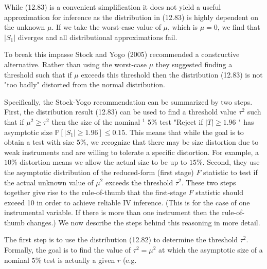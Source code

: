 \documentclass[10pt]{article}
\begin{document}
While (12.83) is a convenient simplification it does not yield a useful approximation for inference as the distribution in (12.83) is highly dependent on the unknown $\mu$. If we take the worst-case value of $\mu$, which is $\mu=0$, we find that $\left|S_{1}\right|$ diverges and all distributional approximations fail.

To break this impasse Stock and Yogo (2005) recommended a constructive alternative. Rather than using the worst-case $\mu$ they suggested finding a threshold such that if $\mu$ exceeds this threshold then the distribution (12.83) is not "too badly" distorted from the normal distribution.

Specifically, the Stock-Yogo recommendation can be summarized by two steps. First, the distribution result (12.83) can be used to find a threshold value $\tau^{2}$ such that if $\mu^{2} \geq \tau^{2}$ then the size of the nominal ${ }^{1}$ 5\% test "Reject if $|T| \geq 1.96$ " has asymptotic size $\mathbb{P}\left[\left|S_{1}\right| \geq 1.96\right] \leq 0.15$. This means that while the goal is to obtain a test with size $5 \%$, we recognize that there may be size distortion due to weak instruments and are willing to tolerate a specific distortion. For example, a $10 \%$ distortion means we allow the actual size to be up to $15 \%$. Second, they use the asymptotic distribution of the reduced-form (first stage) $F$ statistic to test if the actual unknown value of $\mu^{2}$ exceeds the threshold $\tau^{2}$. These two steps together give rise to the rule-of-thumb that the first-stage $F$ statistic should exceed 10 in order to achieve reliable IV inference. (This is for the case of one instrumental variable. If there is more than one instrument then the rule-of-thumb changes.) We now describe the steps behind this reasoning in more detail.

The first step is to use the distribution (12.82) to determine the threshold $\tau^{2}$. Formally, the goal is to find the value of $\tau^{2}=\mu^{2}$ at which the asymptotic size of a nominal $5 \%$ test is actually a given $r$ (e.g.
\end{document}
